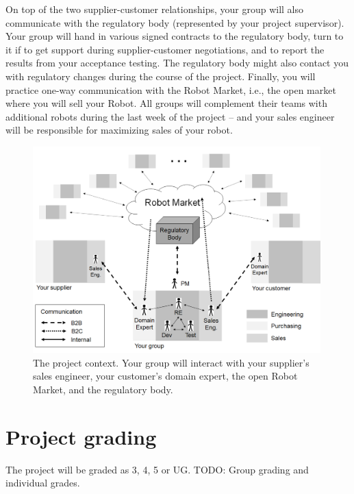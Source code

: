 \documentclass{scrreprt}
\begin{document}
On top of the two supplier-customer relationships, your group will also communicate with the regulatory body (represented by your project supervisor). Your group will hand in various signed contracts to the regulatory body, turn to it if to get support during supplier-customer negotiations, and to report the results from your acceptance testing. The regulatory body might also contact you with regulatory changes during the course of the project. Finally, you will practice one-way communication with the Robot Market, i.e., the open market where you will sell your Robot. All groups will complement their teams with additional robots during the last week of the project -- and your sales engineer will be responsible for maximizing sales of your robot. 

\begin{figure}
\centering
\includegraphics[width=0.99\textwidth]{figures/projectContext.png}
\caption{The project context. Your group will interact with your supplier's sales engineer, your customer's domain expert, the open Robot Market, and the regulatory body.}
\label{fig:context}
\end{figure}

\section{Project grading}
The project will be graded as 3, 4, 5 or UG. TODO: Group grading and individual grades.
\end{document}
